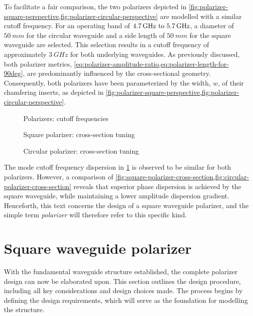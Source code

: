 \documentclass[11pt,a4paper,twoside,openany]{report}
\begin{document}
To facilitate a fair comparison, the two polarizers depicted in \cref{fig:polarizer-square-perspective,fig:polarizer-circular-perspective} are modelled with a similar cutoff frequency. For an operating band of $\frequencyrange$, a diameter of $\qty{50}{mm}$ for the circular waveguide and a side length of $\qty{50}{mm}$ for the square waveguide are selected. This selection results in a cutoff frequency of approximately $\qty{3}{GHz}$ for both underlying waveguides. As previously discussed, both polarizer metrics, \cref{eq:polarizer-amplitude-ratio,eq:polarizer-length-for-90deg}, are predominantly influenced by the cross-sectional geometry. Consequently, both polarizers have been parameterized by the width, $w$, of their chamfering inserts, as depicted in \cref{fig:polarizer-square-perspective,fig:polarizer-circular-perspective}.

\begin{figure}[!ht]
    \centering
    
    \caption{\label{fig:polarizers-cutoff-frequencies}Polarizers: cutoff frequencies}
\end{figure}

\begin{figure}[!ht]
    \centering
    
    \caption{\label{fig:square-polarizer-cross-section}Square polarizer: cross-section tuning}
\end{figure}

\begin{figure}[!ht]
    \centering
    
    \caption{\label{fig:circular-polarizer-cross-section}Circular polarizer: cross-section tuning}
\end{figure}

The mode cutoff frequency dispersion in \cref{fig:polarizers-cutoff-frequencies} is observed to be similar for both polarizers. However, a comparison of \cref{fig:square-polarizer-cross-section,fig:circular-polarizer-cross-section} reveals that superior phase dispersion is achieved by the square waveguide, while maintaining a lower amplitude dispersion gradient. Henceforth, this text concerns the design of a square waveguide polarizer, and the simple term \emph{polarizer} will therefore refer to this specific kind.

\section{Square waveguide polarizer}
With the fundamental waveguide structure established, the complete polarizer design can now be elaborated upon. This section outlines the design procedure, including all key considerations and design choices made. The process begins by defining the design requirements, which will serve as the foundation for modelling the structure.
\end{document}
